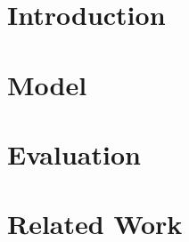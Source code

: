 \documentclass[11pt]{article}
\begin{document}
	\maketitle	
	
	\section{Introduction}\label{sec:introduction}
	
	\section{Model}\label{sec:model}
	
	\section{Evaluation}\label{sec:eval}
	
	\section{Related Work}\label{sec:related}
	
	
	
	
\end{document}

